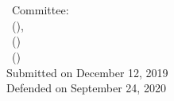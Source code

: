 \hfill
\vfill
\small
\begin{flushleft}
	\textbf{\thesisAuthorName} \\
	\textit{\thesisTitle} \\
	\thesisSubject~Committee:\\
	\quad\thesisFirstReviewer~{\small(\thesisFirstReviewerUniversity)},\\
	\quad\thesisSecondReviewer~{\small(\thesisSecondReviewerUniversity)}\\
	\quad\thesisThirdReviewer~{\small(\thesisThirdReviewerUniversity)}\\
	Submitted on December 12, 2019\\
	Defended on September 24, 2020
\end{flushleft}

\begin{flushleft}
	\textbf{\thesisUniversity} \\
	\thesisUniversityDepartment \\
	\thesisUniversityGroup \\
	\thesisUniversityStreetAddress \\
	\thesisUniversityPostalCode~\thesisUniversityCity
\end{flushleft}